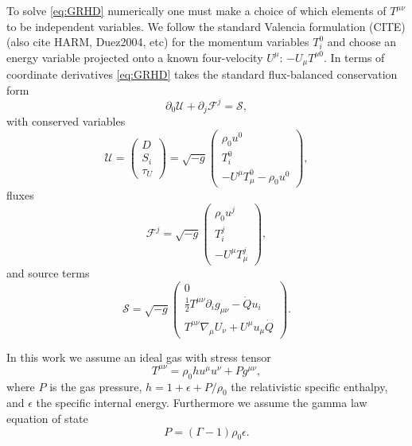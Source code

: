\documentclass{emulateapj}
\newcommand{\Gam}{\Gamma}
\newcommand{\eps}{\epsilon}
\newcommand{\pd}{\partial}
\begin{document}
To solve \eqref{eq:GRHD} numerically one must make a choice of which elements of $T^{\mu\nu}$ to be independent variables.  We follow the standard Valencia formulation (CITE) (also cite HARM, Duez2004, etc) for the momentum variables $T^0_i$ and choose an energy variable projected onto a known four-velocity $U^\mu$: $-U_\mu T^{\mu 0}$.
In terms of coordinate derivatives \eqref{eq:GRHD} takes the standard flux-balanced conservation form
\begin{equation}
    \pd_0 \mathcal{U} + \pd_j \mathcal{F}^j = \mathcal{S} , \label{eq:consLaw}
\end{equation}
with conserved variables
\begin{equation}
    \mathcal{U} = \begin{pmatrix} D \\
                            S_i \\
                            \tau_U
                \end{pmatrix} = \sqrt{-g} \begin{pmatrix} \rho_0 u^0 \\ 
                                                    T^0_i \\
                                                    -U^\mu T_\mu^0 - \rho_0 u^0 \end{pmatrix} , \label{eq:cons}
\end{equation}
fluxes
\begin{equation}
    \mathcal{F}^j = \sqrt{-g} \begin{pmatrix} \rho_0 u^j \\
                                                T^j_i \\
                                                -U^\mu T_\mu^j \end{pmatrix} ,\label{eq:fluxes}
\end{equation}
and source terms 
\begin{equation}
    \mathcal{S} = \sqrt{-g} \begin{pmatrix} 0 \\
                        \frac{1}{2}T^{\mu\nu}\pd_i g_{\mu\nu} - \dot{Q}u_i \\
                        T^{\mu\nu}\nabla_\mu U_\nu + U^\mu u_\mu \dot{Q} \end{pmatrix} .\label{eq:sources}
\end{equation}

In this work we assume an ideal gas with stress tensor
\begin{equation}
	T^{\mu\nu} = \rho_0 h u^\mu u^\nu + P g^{\mu\nu} ,
\end{equation}
where $P$ is the gas pressure, $h = 1 + \eps + P/\rho_0$ the relativistic specific enthalpy, and $\eps$ the specific internal energy. Furthermore we assume the gamma law equation of state
\begin{equation}
	P = (\Gam - 1) \rho_0 \eps . \label{eq:gammalaw}
\end{equation}
\end{document}
